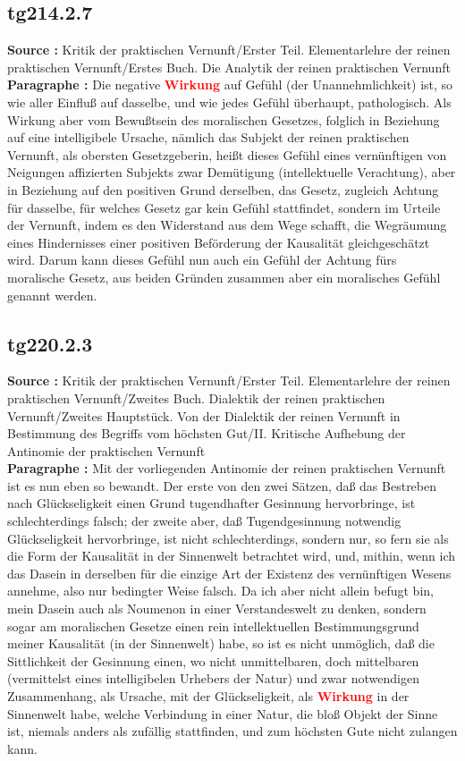 \documentclass[a4paper,12pt,twoside]{book}
\newcommand{\match}[1]{\textcolor{red}{\textbf{#1}}}
\begin{document}
	\subsection*{tg214.2.7} 
	\textbf{Source : }Kritik der praktischen Vernunft/Erster Teil. Elementarlehre der reinen praktischen Vernunft/Erstes Buch. Die Analytik der reinen praktischen Vernunft\\  
	
	\noindent\textbf{Paragraphe : }Die negative \match{Wirkung} auf Gefühl (der Unannehmlichkeit) ist, so wie aller Einfluß auf dasselbe, und wie jedes Gefühl überhaupt, pathologisch. Als Wirkung aber vom Bewußtsein des moralischen Gesetzes, folglich in Beziehung auf eine intelligibele Ursache, nämlich das Subjekt der reinen praktischen Vernunft, als obersten Gesetzgeberin, heißt dieses Gefühl eines vernünftigen von Neigungen affizierten Subjekts zwar Demütigung (intellektuelle Verachtung), aber in Beziehung auf den positiven Grund derselben, das Gesetz, zugleich Achtung für dasselbe, für welches Gesetz gar kein Gefühl stattfindet, sondern im Urteile der Vernunft, indem es den Widerstand aus dem Wege schafft, die Wegräumung eines Hindernisses einer positiven Beförderung der Kausalität gleichgeschätzt wird. Darum kann dieses Gefühl nun auch ein Gefühl der Achtung fürs moralische Gesetz, aus beiden Gründen zusammen aber ein moralisches Gefühl genannt werden. 
	
	\subsection*{tg220.2.3} 
	\textbf{Source : }Kritik der praktischen Vernunft/Erster Teil. Elementarlehre der reinen praktischen Vernunft/Zweites Buch. Dialektik der reinen praktischen Vernunft/Zweites Hauptstück. Von der Dialektik der reinen Vernunft in Bestimmung des Begriffs vom höchsten Gut/II. Kritische Aufhebung der Antinomie der praktischen Vernunft\\  
	
	\noindent\textbf{Paragraphe : }Mit der vorliegenden Antinomie der reinen praktischen Vernunft ist es nun eben so bewandt. Der erste von den zwei Sätzen, daß das Bestreben nach Glückseligkeit einen Grund tugendhafter Gesinnung hervorbringe, ist schlechterdings falsch; der zweite aber, daß Tugendgesinnung notwendig Glückseligkeit hervorbringe, ist nicht schlechterdings, sondern nur, so fern sie als die Form der Kausalität in der Sinnenwelt betrachtet wird, und, mithin, wenn ich das Dasein in derselben für die einzige Art der Existenz des vernünftigen Wesens annehme, also nur bedingter Weise falsch. Da ich aber nicht allein befugt bin, mein Dasein auch als Noumenon in einer Verstandeswelt zu denken, sondern sogar am moralischen Gesetze einen rein intellektuellen Bestimmungsgrund meiner Kausalität (in der Sinnenwelt) habe, so ist es nicht unmöglich, daß die Sittlichkeit der Gesinnung einen, wo nicht unmittelbaren, doch mittelbaren (vermittelst eines intelligibelen Urhebers  der Natur) und zwar notwendigen Zusammenhang, als Ursache, mit der Glückseligkeit, als \match{Wirkung} in der Sinnenwelt habe, welche Verbindung in einer Natur, die bloß Objekt der Sinne ist, niemals anders als zufällig stattfinden, und zum höchsten Gute nicht zulangen kann. 
	
\end{document}
